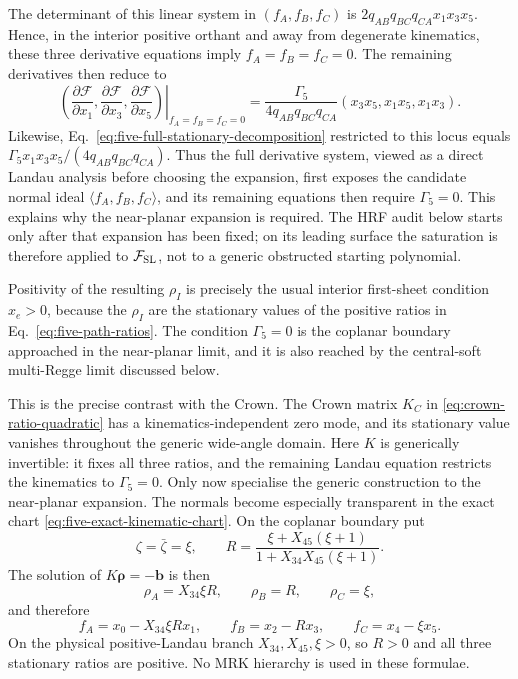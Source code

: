 \documentclass[a4paper,11pt]{article}
\newcommand{\FSL}{\mathcal F_{\rm SL}}
\begin{document}
The determinant of this linear system in \((f_A,f_B,f_C)\) is
\(2q_{AB}q_{BC}q_{CA}x_1x_3x_5\).  Hence, in the interior positive orthant
and away from degenerate kinematics, these three derivative equations imply
\(f_A=f_B=f_C=0\).  The remaining derivatives then reduce to
\begin{equation}
 \left.\left(
 \frac{\partial\mathcal F}{\partial x_1},
 \frac{\partial\mathcal F}{\partial x_3},
 \frac{\partial\mathcal F}{\partial x_5}
 \right)\right|_{f_A=f_B=f_C=0}
 =\frac{\Gamma_5}{4q_{AB}q_{BC}q_{CA}}
 (x_3x_5,x_1x_5,x_1x_3).
 \label{eq:five-remaining-gradient-system}
\end{equation}
Likewise, Eq.~\eqref{eq:five-full-stationary-decomposition} restricted to
this locus equals
\(\Gamma_5x_1x_3x_5/(4q_{AB}q_{BC}q_{CA})\).  Thus the full derivative
system, viewed as a direct Landau analysis before choosing the expansion,
first exposes the candidate normal ideal
\(\langle f_A,f_B,f_C\rangle\), and its remaining equations then require
\(\Gamma_5=0\).  This explains why the near-planar expansion is required.
The HRF audit below starts only after that expansion has been fixed; on its
leading surface the saturation is therefore applied to \(\FSL\), not to a
generic obstructed starting polynomial.

Positivity of the resulting \(\rho_I\) is precisely the usual interior
first-sheet condition \(x_e>0\), because the \(\rho_I\) are the stationary
values of the positive ratios in Eq.~\eqref{eq:five-path-ratios}.  The
condition \(\Gamma_5=0\) is the coplanar boundary approached in the
near-planar limit, and it is also reached by the central-soft multi-Regge
limit discussed below.

This is the precise contrast with the Crown.  The Crown matrix \(K_C\) in
\eqref{eq:crown-ratio-quadratic} has a kinematics-independent zero mode, and
its stationary value vanishes throughout the generic wide-angle domain.
Here \(K\) is generically invertible: it fixes all three ratios, and the
remaining Landau equation restricts the kinematics to \(\Gamma_5=0\).
Only now specialise the generic construction to the near-planar expansion.
The normals become especially transparent in the exact chart
\eqref{eq:five-exact-kinematic-chart}.  On the coplanar boundary put
\begin{equation}
 \zeta=\bar\zeta=\xi,\qquad
 R=\frac{\xi+X_{45}(\xi+1)}
       {1+X_{34}X_{45}(\xi+1)}.
 \label{eq:five-near-planar-ratio-variables}
\end{equation}
The solution of \(K\boldsymbol\rho=-\boldsymbol b\) is then
\begin{equation}
 \rho_A=X_{34}\xi R,\qquad
 \rho_B=R,\qquad \rho_C=\xi,
 \label{eq:five-near-planar-rhos}
\end{equation}
and therefore
\begin{equation}
 f_A=x_0-X_{34}\xi R x_1,\qquad
 f_B=x_2-Rx_3,\qquad
 f_C=x_4-\xi x_5.
 \label{eq:five-near-planar-factors}
\end{equation}
On the physical positive-Landau branch
\(X_{34},X_{45},\xi>0\), so \(R>0\) and all three stationary ratios are
positive.  No MRK
hierarchy is used in these formulae.
\end{document}
